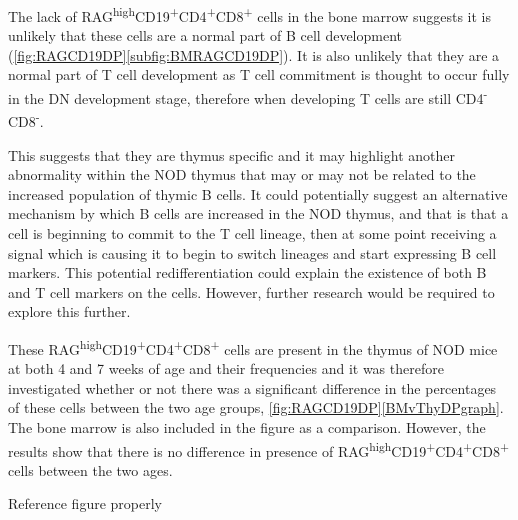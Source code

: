 The lack of RAG\textsuperscript{high}CD19\textsuperscript{+}CD4\textsuperscript{+}CD8\textsuperscript{+} cells in the bone marrow suggests it is unlikely that these cells are a normal part of B cell development (\cref{fig:RAGCD19DP}\ref{subfig:BMRAGCD19DP}). %
It is also unlikely that they are a normal part of T cell development as T cell commitment is thought to occur fully in the DN development stage, therefore when developing T cells are still CD4\textsuperscript{-}CD8\textsuperscript{-}.

This suggests that they are thymus specific and it may highlight another abnormality within the NOD thymus that may or may not be related to the increased population of thymic B cells.
It could potentially suggest an alternative mechanism by which B cells are increased in the NOD thymus, and that is that a cell is beginning to commit to the T cell lineage, then at some point receiving a signal which is causing it to begin to switch lineages and start expressing B cell markers.
This potential redifferentiation could explain the existence of both B and T cell markers on the cells. 
However, further research would be required to explore this further.

These RAG\textsuperscript{high}CD19\textsuperscript{+}CD4\textsuperscript{+}CD8\textsuperscript{+} cells are present in the thymus of NOD mice at both 4 and 7 weeks of age and their frequencies   and it was therefore investigated whether or not there was a significant difference in the percentages of these cells between the two age groups, \cref{fig:RAGCD19DP}\ref{BMvThyDPgraph}. 
The bone marrow is also included in the figure as a comparison.
However, the results show that there is no difference in presence of RAG\textsuperscript{high}CD19\textsuperscript{+}CD4\textsuperscript{+}CD8\textsuperscript{+} cells between the two ages. 


Reference figure properly

